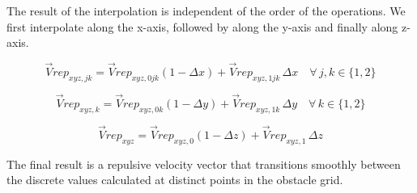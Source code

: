 \documentclass[letterpaper, 10 pt, conference]{ieeeconf}  %
\begin{document}
The result of the interpolation is independent of the order of the operations. We first interpolate along the x-axis, followed by along the y-axis and finally along z-axis.

	
\begin{equation}
	\label{eq: interp x}
	\vec{V}rep_{xyz,jk} = \vec{V}rep_{xyz,0jk}(1 - \Delta x) + \vec{V}rep_{xyz,1jk} \, \Delta x \quad \forall \, j, k \in \{1, 2\}
\end{equation}

%

\begin{equation}
	\label{eq: interp y}
	\vec{V}rep_{xyz,k} = \vec{V}rep_{xyz,0k}(1 - \Delta y) + \vec{V}rep_{xyz,1k} \, \Delta y \quad \forall \, k \in \{1, 2\}
\end{equation}

\begin{equation}
	\label{eq: interp z}
	\vec{V}rep_{xyz} = \vec{V}rep_{xyz,0}(1 - \Delta z) + \vec{V}rep_{xyz,1} \, \Delta z 
\end{equation}

The final result is a repulsive velocity vector that transitions smoothly between the discrete values calculated at distinct points in the obstacle grid.
\end{document}
